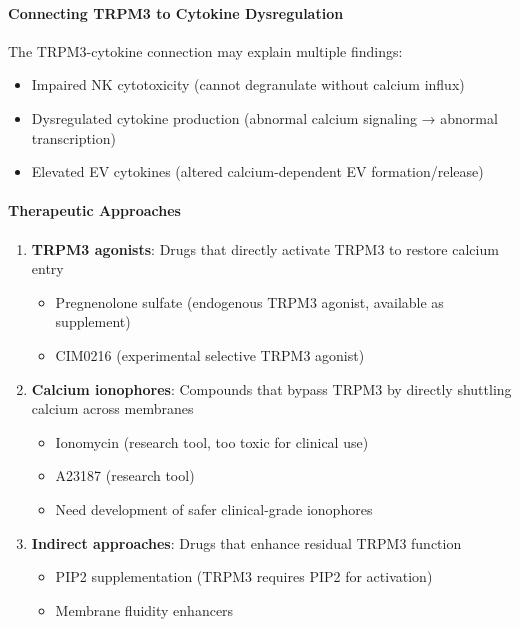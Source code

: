 \paragraph{Connecting TRPM3 to Cytokine Dysregulation}
The TRPM3-cytokine connection may explain multiple findings:
\begin{itemize}
    \item Impaired NK cytotoxicity (cannot degranulate without calcium influx)
    \item Dysregulated cytokine production (abnormal calcium signaling → abnormal transcription)
    \item Elevated EV cytokines (altered calcium-dependent EV formation/release)
\end{itemize}

\paragraph{Therapeutic Approaches}
\begin{enumerate}
    \item \textbf{TRPM3 agonists}: Drugs that directly activate TRPM3 to restore calcium entry
    \begin{itemize}
        \item Pregnenolone sulfate (endogenous TRPM3 agonist, available as supplement)
        \item CIM0216 (experimental selective TRPM3 agonist)
    \end{itemize}
    \item \textbf{Calcium ionophores}: Compounds that bypass TRPM3 by directly shuttling calcium across membranes
    \begin{itemize}
        \item Ionomycin (research tool, too toxic for clinical use)
        \item A23187 (research tool)
        \item Need development of safer clinical-grade ionophores
    \end{itemize}
    \item \textbf{Indirect approaches}: Drugs that enhance residual TRPM3 function
    \begin{itemize}
        \item PIP2 supplementation (TRPM3 requires PIP2 for activation)
        \item Membrane fluidity enhancers
    \end{itemize}
\end{enumerate}

